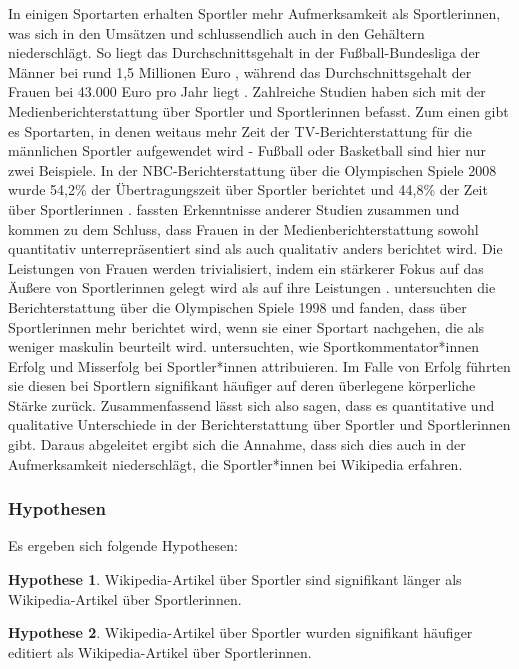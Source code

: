 \documentclass[11pt]{article}
\begin{document}
In einigen Sportarten erhalten Sportler mehr Aufmerksamkeit als Sportlerinnen, was sich in den Umsätzen und schlussendlich auch in den Gehältern niederschlägt. So liegt das Durchschnittsgehalt in der Fußball-Bundesliga der Männer bei rund 1,5 Millionen Euro \parencite{Harris2015}, während das Durchschnittsgehalt der Frauen bei 43.000 Euro pro Jahr liegt \parencite{soccerIncomeWomen}. Zahlreiche Studien haben sich mit der Medienberichterstattung über Sportler und Sportlerinnen befasst. Zum einen gibt es Sportarten, in denen weitaus mehr Zeit der TV-Berichterstattung für die männlichen Sportler aufgewendet wird - Fußball oder Basketball sind hier nur zwei Beispiele. In der NBC-Berichterstattung über die Olympischen Spiele 2008 wurde 54,2\% der Übertragungszeit über Sportler berichtet und 44,8\% der Zeit über Sportlerinnen \parencite{Billings2008}. \textcite{Trolan2013} fassten Erkenntnisse anderer Studien zusammen und kommen zu dem Schluss, dass Frauen in der Medienberichterstattung sowohl quantitativ unterrepräsentiert sind als auch qualitativ anders berichtet wird. Die Leistungen von Frauen werden trivialisiert, indem ein stärkerer Fokus auf das Äußere von Sportlerinnen gelegt wird als auf ihre Leistungen \parencite{Harris2005,Vincent2004}. \textcite{Jones1999} untersuchten die Berichterstattung über die Olympischen Spiele 1998 und fanden, dass über Sportlerinnen mehr berichtet wird, wenn sie einer Sportart nachgehen, die als weniger maskulin beurteilt wird. \textcite{Billings2008} untersuchten, wie Sportkommentator*innen Erfolg und Misserfolg bei Sportler*innen attribuieren. Im Falle von Erfolg führten sie diesen bei Sportlern signifikant häufiger auf deren überlegene körperliche Stärke zurück.
Zusammenfassend lässt sich also sagen, dass es quantitative und qualitative Unterschiede in der Berichterstattung über Sportler und Sportlerinnen gibt. Daraus abgeleitet ergibt sich die Annahme, dass sich dies auch in der Aufmerksamkeit niederschlägt, die Sportler*innen bei Wikipedia erfahren.

\subsubsection*{Hypothesen}

Es ergeben sich folgende Hypothesen:

\textbf{Hypothese 1}. Wikipedia-Artikel über Sportler sind signifikant länger als Wikipedia-Artikel über Sportlerinnen.

\textbf{Hypothese 2}. Wikipedia-Artikel über Sportler wurden signifikant häufiger editiert als Wikipedia-Artikel über Sportlerinnen.
\end{document}
